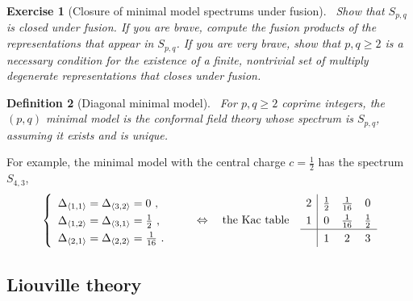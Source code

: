 \documentclass[12pt, a4paper]{article}
\theoremstyle{break}
\newtheorem{exo}{Exercise}[section]
\newtheorem{defn}[exo]{Definition}
\begin{document}
\begin{exo}[Closure of minimal model spectrums under fusion]
 ~\label{exo:cmm}
 Show that $S_{p,q}$ is closed under fusion. If you are brave, compute the fusion products of the representations that appear in $S_{p,q}$. If you are very brave, show that $p,q\geq 2$ is a necessary condition for the existence of a finite, nontrivial set of multiply degenerate representations that closes under fusion.
\end{exo}

\begin{defn}[Diagonal minimal model]
 ~\label{def:dmm}
 For $p,q\geq 2$ coprime integers, the $(p,q)$ minimal model is the conformal field theory whose spectrum is $S_{p, q}$, assuming it exists and is unique.
\end{defn}
For example, the minimal model with the central charge $c=\frac12$ has the spectrum $S_{4,3}$, 
\begin{align}
\renewcommand{\arraystretch}{1.3}
 \left\{\begin{array}{l} \Delta_{\langle 1,1\rangle}=\Delta_{\langle 3,2\rangle} = 0 \ , \\ \Delta_{\langle 1,2\rangle} =\Delta_{\langle 3,1\rangle} = \frac12 \ , \\ \Delta_{\langle 2,1\rangle} =\Delta_{\langle 2,2\rangle} = \frac{1}{16} \ .\end{array}\right. 
 \qquad \Leftrightarrow \quad \text{the Kac table} \quad 
 \begin{array}{c|ccc} 2 & \frac{1}{2} & \frac{1}{16} & 0 \\ 1 & 0 & \frac{1}{16} & \frac{1}{2} \\  \hline & 1 & 2 & 3 \end{array} 
\end{align}

\subsection{Liouville theory}
\end{document}

